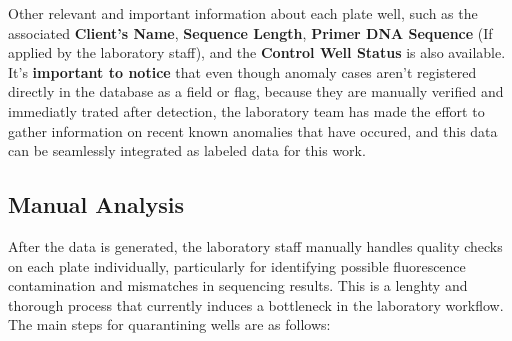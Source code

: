 Other relevant and important information about each plate well, such as the associated \textbf{Client's Name}, \textbf{Sequence Length}, \textbf{Primer DNA Sequence} (If applied by the laboratory staff), and the \textbf{Control Well Status} is also available.  
\newline
It's \textbf{important to notice} that even though anomaly cases aren't registered directly in the database as a field or flag, because they are manually verified and immediatly trated after detection, the laboratory team has made the effort to gather information on recent known anomalies that have occured, and this data can be seamlessly integrated as labeled data for this work.
\subsection{Manual Analysis}

After the data is generated, the laboratory staff manually handles quality checks on each plate individually, particularly for identifying possible fluorescence contamination and mismatches in sequencing results. This is a lenghty and thorough process that currently induces a bottleneck in the laboratory workflow. The main steps for quarantining wells are as follows:

